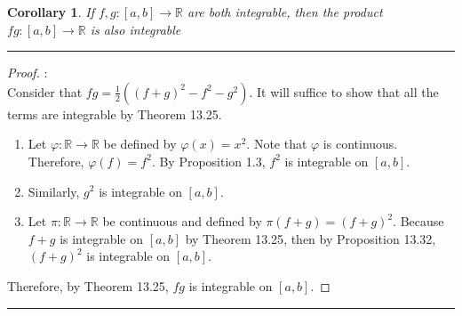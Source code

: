 \documentclass[openany, amssymb, psamsfonts]{amsart}
\newcommand{\bbR}{\mathbb{R}}
\renewcommand{\phi}{\varphi}
\newtheorem{cor}{Corollary}[section]
\theoremstyle{definition}
\numberwithin{equation}{section}
\begin{document}
\begin{cor}
    If $f, g : [a, b] \to \bbR$ are both integrable, then the product $f g : [a, b] \to \bbR$ is also integrable
\end{cor}
\vspace{4pt}     \hrule   \vspace{4pt}\begin{proof}:\\
Consider that $fg = \frac{1}{2}((f+g)^2 -f^2 - g^2).$ It will suffice to show that all the terms are integrable by Theorem {13.25}. 
\begin{enumerate}
    \item Let $\phi:\bbR \to \bbR$ be defined by $\phi(x) = x^2.$ Note that $\phi$ is continuous. Therefore, $\phi(f) = f^2.$ By Proposition {1.3}, $f^2$ is integrable on $[a,b].$
    \item Similarly, $g^2$ is integrable on $[a,b].$
    \item Let $\pi:\bbR \to \bbR$ be continuous and defined by $\pi(f+g) = (f+g)^2.$ Because $f+g$ is integrable on $[a,b]$ by Theorem {13.25}, then by Proposition {13.32}, $(f+g)^2$ is integrable on $[a,b].$
\end{enumerate}
Therefore, by Theorem {13.25}, $fg$ is integrable on $[a,b].$
\end{proof}\vspace{4pt}     \hrule   \vspace{4pt}

\newpage
\end{document}
